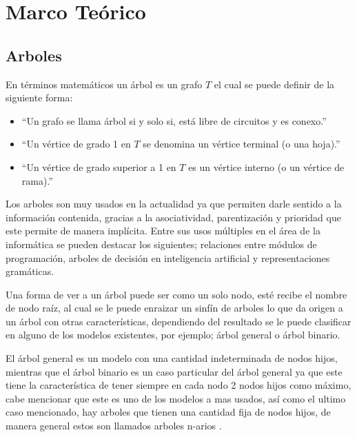 \chapter{ Marco Teórico  \label{cap2}}
\section{Arboles}
En términos matemáticos un árbol es un grafo $T$ el cual se puede definir de
 la siguiente forma\cite{SUSANNAS.EPP2012}:

\begin{itemize}
	\item ``Un grafo se llama árbol si y solo si, está libre de circuitos y
	 es conexo.''
	\item ``Un vértice de grado 1 en $T$ se denomina un vértice terminal (o
	 una hoja).''
	\item ``Un vértice de grado superior a 1 en $T$ es un vértice interno (o
	 un vértice de rama).''
\end{itemize}

Los arboles son muy usados en la actualidad ya que permiten  darle sentido a
 la información contenida, gracias a la asociatividad, parentización y
 prioridad que este permite de manera implícita. Entre sus usos múltiples en
 el área de la informática se pueden destacar los  siguientes; relaciones
 entre módulos de programación, arboles de decisión en inteligencia artificial
 y representaciones gramáticas\cite{gutierrez1999estructuras}.  

Una forma de ver a un árbol puede ser como un solo nodo, esté recibe el nombre
 de  nodo raíz, al cual se le puede enraizar un sinfín de arboles lo que da
 origen  a un árbol con otras características, dependiendo del resultado se le
 puede clasificar en alguno de los modelos existentes, por ejemplo; árbol 
 general o árbol binario\cite{gutierrez1999estructuras}. 

El árbol general es un modelo con una cantidad indeterminada de nodos hijos,
 mientras que el árbol binario es un caso particular del árbol general ya que
 este tiene la característica de tener siempre en cada nodo 2 nodos hijos como
 máximo, cabe mencionar que este es uno de los modelos a mas usados, así como
 el ultimo caso mencionado, hay arboles que tienen una cantidad fija de nodos
 hijos, de manera general estos son llamados arboles n-arios
 \cite{gutierrez1999estructuras}.
 
